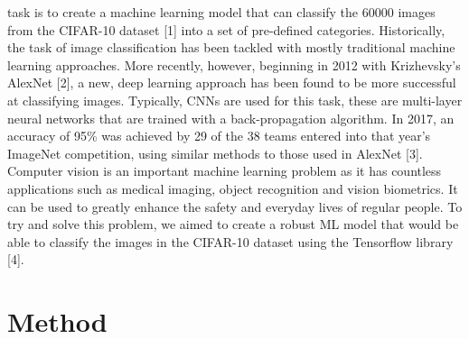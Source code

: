 \documentclass[journal]{IEEEtran}
\begin{document}
 task is to create
a machine learning model that can classify the 60000 images from the CIFAR-10 dataset [1] into a set of pre-defined categories. Historically, the task of image classification has been tackled with mostly traditional machine learning approaches. More recently, however, beginning in 2012 with Krizhevsky’s AlexNet [2], a new, deep learning approach has been found to be more successful at classifying images. Typically, CNNs are used for this task, these are multi-layer neural networks that are trained with a back-propagation algorithm. In 2017, an accuracy of 95\% was achieved by 29 of the 38 teams entered into that year’s ImageNet competition, using similar methods to those used in AlexNet [3]. Computer vision is an important machine learning problem as it has countless applications such as medical imaging, object recognition and vision biometrics. It can be used to greatly enhance the safety and everyday lives of regular people. To try and solve this problem, we aimed to create a robust ML model that would be able to classify the images in the CIFAR-10 dataset using the Tensorflow library [4].


\section{Method}
\end{document}

